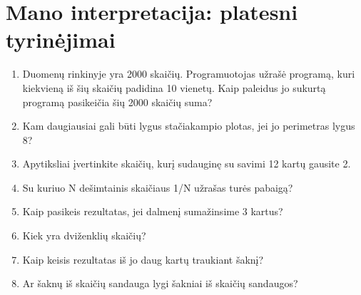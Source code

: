 \documentclass{article}
\begin{document}
\section*{Mano interpretacija: platesni tyrinėjimai}
\begin{enumerate}
\setcounter{enumi}{\theenumTemp}
\item Duomenų rinkinyje yra 2000 skaičių. Programuotojas užrašė programą, kuri kiekvieną iš šių skaičių padidina 10 vienetų. Kaip paleidus jo sukurtą programą pasikeičia šių 2000 skaičių suma?
\item Kam daugiausiai gali būti lygus stačiakampio plotas, jei jo perimetras lygus 8?
\item Apytiksliai įvertinkite skaičių, kurį sudauginę su savimi 12 kartų gausite 2.
\item Su kuriuo N dešimtainis skaičiaus 1/N užrašas turės pabaigą?
\item Kaip pasikeis rezultatas, jei dalmenį sumažinsime 3 kartus?
\item Kiek yra dviženklių skaičių?
\item Kaip keisis rezultatas iš jo daug kartų traukiant šaknį?
\item Ar šaknų iš skaičių sandauga lygi šakniai iš skaičių sandaugos?
\setcounter{enumTemp}{\theenumi}
\end{enumerate}
\end{document}
